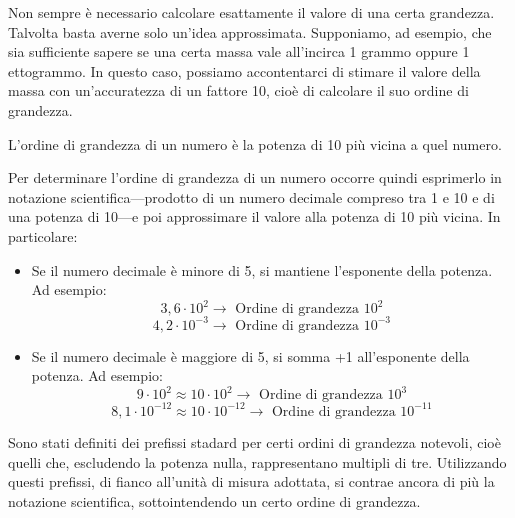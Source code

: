 Non sempre è necessario calcolare esattamente il valore di una certa grandezza.
Talvolta basta averne solo un'idea approssimata. Supponiamo, ad esempio, che sia
sufficiente sapere se una certa massa vale all'incirca 1 grammo oppure 1
ettogrammo. In questo caso, possiamo accontentarci di stimare il valore della
massa con un'accuratezza di un fattore 10, cioè di calcolare il suo ordine di
grandezza.

\vspace{8pt}
\begin{tcolorbox}[colback = yellow!30, colframe = yellow!30!black, title = {Ordine di grandezza}]
L'ordine di grandezza di un numero è la potenza di 10 più vicina a quel numero.
\end{tcolorbox}
\vspace{5pt}

Per determinare l'ordine di grandezza di un numero occorre quindi esprimerlo in
notazione scientifica—prodotto di un numero decimale compreso tra 1 e 10 e di
una potenza di 10—e poi approssimare il valore alla potenza di 10 più vicina.
In particolare:
\begin{itemize}
    \item Se il numero decimale è minore di 5, si mantiene l'esponente della
    potenza. Ad esempio:
    \[ 3,6 \cdot 10^2 \to \text{ Ordine di grandezza } 10^2 \]
    \[ 4,2 \cdot 10^{-3} \to \text{ Ordine di grandezza } 10^{-3} \]

    \item Se il numero decimale è maggiore di 5, si somma +1 all'esponente della
    potenza. Ad esempio:
    \[ 9 \cdot 10^2 \approx 10 \cdot 10^2 \to \text{ Ordine di grandezza } 10^3 \]
    \[ 8,1 \cdot 10^{-12} \approx 10 \cdot 10^{-12} \to \text{ Ordine di grandezza } 10^{-11} \]
\end{itemize}


Sono stati definiti dei prefissi stadard per certi ordini di grandezza notevoli,
cioè quelli che, escludendo la potenza nulla, rappresentano multipli di tre.
Utilizzando questi prefissi, di fianco all'unità di misura adottata, si contrae
ancora di più la notazione scientifica, sottointendendo un certo ordine di
grandezza.

